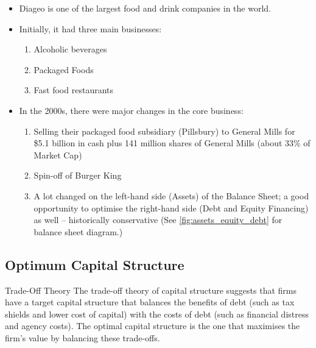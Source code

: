 \begin{itemize}
    \item Diageo is one of the largest food and drink companies in the world.
    \item Initially, it had three main businesses: 
    \begin{enumerate}
        \item Alcoholic beverages
        \item Packaged Foods
        \item Fast food restaurants
    \end{enumerate}
    \item In the 2000s, there were major changes in the core business:
    \begin{enumerate}
        \item Selling their packaged food subsidiary (Pillsbury) to General Mills for \$5.1 billion in cash plus 141 million shares of General Mills (about 33\% of Market Cap)
        \item Spin-off of Burger King
        \item A lot changed on the left-hand side (Assets) of the Balance Sheet; a good opportunity to optimise the right-hand side (Debt and Equity Financing) as well – historically conservative (See \ref{fig:assets_equity_debt} for balance sheet diagram.)
    \end{enumerate}
\end{itemize}


\subsection*{Optimum Capital Structure}
\begin{theorembox}{Trade-Off Theory}
    The trade-off theory of capital structure suggests that firms have a target capital structure that balances the benefits of debt (such as tax shields and lower cost of capital) with the costs of debt (such as financial distress and agency costs). The optimal capital structure is the one that maximises the firm's value by balancing these trade-offs.
\end{theorembox}



